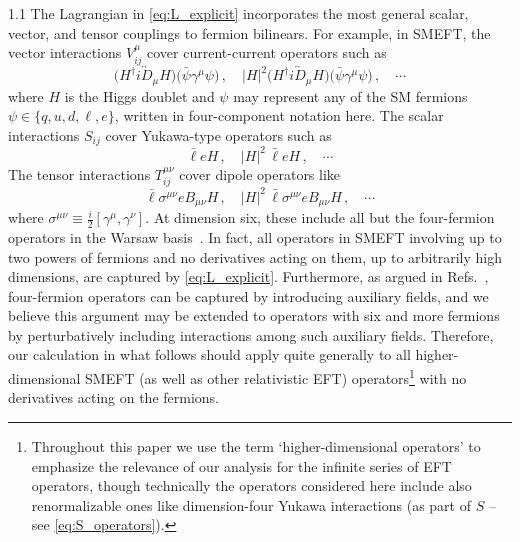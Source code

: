 \documentclass[a4paper,12pt]{article}
\begin{document}
\begin{spacing}{1.1}
The Lagrangian in \cref{eq:L_explicit} incorporates the most general scalar, vector, and tensor couplings to fermion bilinears. For example, in SMEFT, the vector interactions $V_{ij}^\mu$ cover current-current operators such as
\begin{equation}
\bigl(H^\dagger i\overleftrightarrow{D}_\mu H\bigr) \bigl(\bar\psi \gamma^\mu \psi \bigr) \,,\quad
|H|^2 \bigl(H^\dagger i\overleftrightarrow{D}_\mu H\bigr) \bigl(\bar\psi \gamma^\mu \psi \bigr) \,,\quad
\cdots
\end{equation}
where $H$ is the Higgs doublet and $\psi$ may represent any of the SM fermions $\psi \in \{q, u, d, \ell, e\}$, written in four-component notation here. The scalar interactions $S_{ij}$ cover Yukawa-type operators such as
\begin{equation}
{\bar \ell} e H \,,\quad
|H|^2\, {\bar \ell} e H \,,\quad
\cdots
\label{eq:S_operators}
\end{equation}
The tensor interactions $T_{ij}^{\mu\nu}$ cover dipole operators like
\begin{equation}
{\bar \ell} \sigma^{\mu\nu} e B_{\mu\nu} H \,,\quad
|H|^2\, {\bar \ell} \sigma^{\mu\nu} e B_{\mu\nu} H \,,\quad
\cdots
\end{equation}
where $\sigma^{\mu\nu}\equiv \frac{i}{2}[\gamma^\mu, \gamma^\nu]$. At dimension six, these include all but the four-fermion operators in the Warsaw basis~\cite{Grzadkowski:2010es}. In fact, all operators in SMEFT involving up to two powers of fermions and no derivatives acting on them, up to arbitrarily high dimensions, are captured by \cref{eq:L_explicit}. Furthermore, as argued in Refs.~\cite{Soto:1990ij,Feruglio:2020kfq}, four-fermion operators can be captured by introducing auxiliary fields, and we believe this argument may be extended to operators with six and more fermions by perturbatively including interactions among such auxiliary fields. Therefore, our calculation in what follows should apply quite generally to all higher-dimensional SMEFT (as well as other relativistic EFT) operators\footnote{Throughout this paper we use the term `higher-dimensional operators' to emphasize the relevance of our analysis for the infinite series of EFT operators, though technically the operators considered here include also renormalizable ones like dimension-four Yukawa interactions (as part of $S$ -- see \cref{eq:S_operators}).} with no derivatives acting on the fermions.




\end{spacing}
\end{document}
